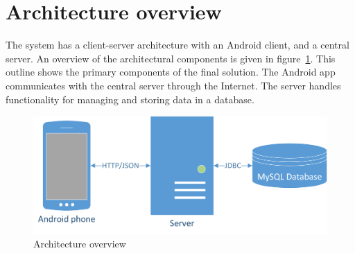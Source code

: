 \section{Architecture overview}
The system has a client-server architecture with an Android client, and a central server. An overview of the architectural components is given in figure~\ref{fig:architecture}. This outline shows the primary components of the final solution. The Android app communicates with the central server through the Internet. The server handles functionality for managing and storing data in a database.

\begin{figure}[H]
\includegraphics[width=\textwidth]{ch/architecture/fig/arch.png}
\caption{Architecture overview}
\label{fig:architecture}
\end{figure}
